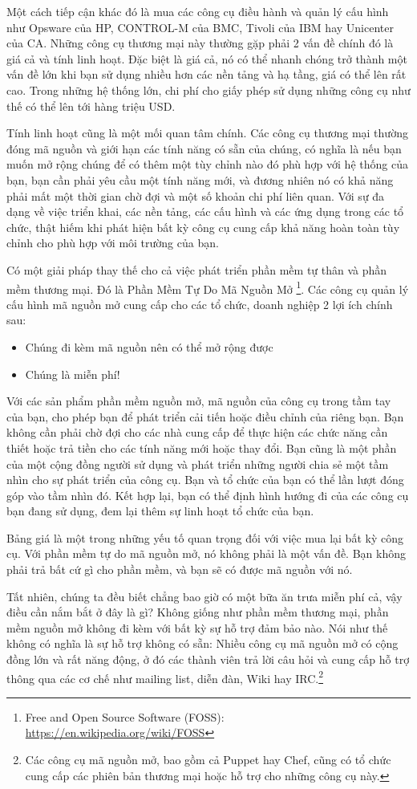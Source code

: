 Một cách tiếp cận khác đó là mua các công cụ điều hành và quản lý cấu hình như Opsware của HP, CONTROL-M của BMC, Tivoli của IBM hay Unicenter của CA. Những công cụ thương mại này thường gặp phải 2 vấn đề chính đó là giá cả và tính linh hoạt. Đặc biệt là giá cả, nó có thể nhanh chóng trở thành một vấn đề lớn khi bạn sử dụng nhiều hơn các nền tảng và hạ tầng, giá có thể lên rất cao. Trong những hệ thống lớn, chi phí cho giấy phép sử dụng những công cụ như thế có thể lên tới hàng triệu USD.

Tính linh hoạt cũng là một mối quan tâm chính. Các công cụ thương mại thường đóng mã nguồn và giới hạn các tính năng có sẵn của chúng, có nghĩa là nếu bạn muốn mở rộng chúng để có thêm một tùy chỉnh nào đó phù hợp với hệ thống của bạn, bạn cần phải yêu cầu một tính năng mới, và đương nhiên nó có khả năng phải mất một thời gian chờ đợi và  một số khoản chi phí liên quan. Với sự đa dạng về việc triển khai, các nền tảng, các cấu hình và các ứng dụng trong các tổ chức, thật hiếm khi phát hiện bất kỳ công cụ cung cấp khả năng hoàn toàn tùy chỉnh cho phù hợp với môi trường của bạn.

Có một giải pháp thay thế cho cả việc phát triển phần mềm tự thân và phần mềm thương mại. Đó là Phần Mềm Tự Do Mã Nguồn Mở \footnote{Free and Open Source Software (FOSS): \url{https://en.wikipedia.org/wiki/FOSS}}. Các công cụ quản lý cấu hình mã nguồn mở cung cấp cho các tổ chức, doanh nghiệp 2 lợi ích chính sau:

\begin{itemize}
\item Chúng đi kèm mã nguồn nên có thể mở rộng được
\item Chúng là miễn phí!
\end{itemize}

Với các sản phẩm phần mềm nguồn mở, mã nguồn của công cụ trong tầm tay của bạn, cho phép bạn để phát triển cải tiến hoặc điều chỉnh của riêng bạn. Bạn không cần phải chờ đợi cho các nhà cung cấp để thực hiện các chức năng cần thiết hoặc trả tiền cho các tính năng mới hoặc thay đổi. Bạn cũng là một phần của một cộng đồng người sử dụng và phát triển những người chia sẻ một tầm nhìn cho sự phát triển của công cụ. Bạn và tổ chức của bạn có thể lần lượt đóng góp vào tầm nhìn đó. Kết hợp lại, bạn có thể định hình hướng đi của các công cụ bạn đang sử dụng, đem lại thêm sự linh hoạt tổ chức của bạn.

Bảng giá là một trong những yếu tố quan trọng đối với việc mua lại bất kỳ công cụ. Với phần mềm tự do mã nguồn mở, nó không phải là một vấn đề. Bạn không phải trả bất cứ gì cho phần mềm, và bạn sẽ có được mã nguồn với nó.

Tất nhiên, chúng ta đều biết chẳng bao giờ có một bữa ăn trưa miễn phí cả, vậy điều cần nắm bắt ở đây là gì? Không giống như phần mềm thương mại, phần mềm nguồn mở không đi kèm với bất kỳ sự hỗ trợ đảm bảo nào. Nói như thế không có nghĩa là sự hỗ trợ không có sẵn: Nhiều công cụ mã nguồn mở có cộng đồng lớn và rất năng động, ở đó các thành viên trả lời câu hỏi và cung cấp hỗ trợ thông qua các cơ chế như mailing list, diễn đàn, Wiki hay IRC.\footnote{Các công cụ mã nguồn mở, bao gồm cả Puppet hay Chef, cũng có tổ chức cung cấp các phiên bản thương mại hoặc hỗ trợ cho những công cụ này.}
